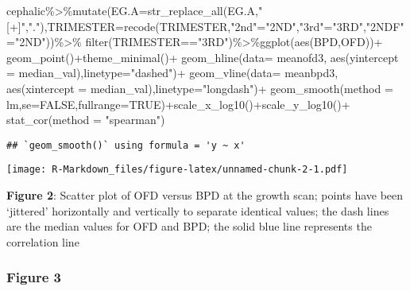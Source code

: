 \documentclass[
]{article}
\newenvironment{Shaded}{\begin{snugshade}}{\end{snugshade}}
\newcommand{\AttributeTok}[1]{\textcolor[rgb]{0.77,0.63,0.00}{#1}}
\newcommand{\ConstantTok}[1]{\textcolor[rgb]{0.00,0.00,0.00}{#1}}
\newcommand{\FunctionTok}[1]{\textcolor[rgb]{0.00,0.00,0.00}{#1}}
\newcommand{\NormalTok}[1]{#1}
\newcommand{\OtherTok}[1]{\textcolor[rgb]{0.56,0.35,0.01}{#1}}
\newcommand{\SpecialCharTok}[1]{\textcolor[rgb]{0.00,0.00,0.00}{#1}}
\newcommand{\StringTok}[1]{\textcolor[rgb]{0.31,0.60,0.02}{#1}}
\begin{document}
\begin{Shaded}
\begin{Highlighting}[]
\NormalTok{cephalic}\SpecialCharTok{\%\textgreater{}\%}\FunctionTok{mutate}\NormalTok{(}\AttributeTok{EG.A=}\FunctionTok{str\_replace\_all}\NormalTok{(EG.A,}\StringTok{"[+]"}\NormalTok{,}\StringTok{"."}\NormalTok{),}\AttributeTok{TRIMESTER=}\FunctionTok{recode}\NormalTok{(TRIMESTER,}\StringTok{"2nd"}\OtherTok{=}\StringTok{"2ND"}\NormalTok{,}\StringTok{"3rd"}\OtherTok{=}\StringTok{"3RD"}\NormalTok{,}\StringTok{"2NDF"}\OtherTok{=}\StringTok{"2ND"}\NormalTok{))}\SpecialCharTok{\%\textgreater{}\%}
  \FunctionTok{filter}\NormalTok{(TRIMESTER}\SpecialCharTok{==}\StringTok{"3RD"}\NormalTok{)}\SpecialCharTok{\%\textgreater{}\%}\FunctionTok{ggplot}\NormalTok{(}\FunctionTok{aes}\NormalTok{(BPD,OFD))}\SpecialCharTok{+}
  \FunctionTok{geom\_point}\NormalTok{()}\SpecialCharTok{+}\FunctionTok{theme\_minimal}\NormalTok{()}\SpecialCharTok{+}
  \FunctionTok{geom\_hline}\NormalTok{(}\AttributeTok{data=}\NormalTok{ meanofd3, }\FunctionTok{aes}\NormalTok{(}\AttributeTok{yintercept =}\NormalTok{ median\_val),}\AttributeTok{linetype=}\StringTok{"dashed"}\NormalTok{)}\SpecialCharTok{+}
  \FunctionTok{geom\_vline}\NormalTok{(}\AttributeTok{data=}\NormalTok{ meanbpd3, }\FunctionTok{aes}\NormalTok{(}\AttributeTok{xintercept =}\NormalTok{ median\_val),}\AttributeTok{linetype=}\StringTok{"longdash"}\NormalTok{)}\SpecialCharTok{+}
  \FunctionTok{geom\_smooth}\NormalTok{(}\AttributeTok{method =}\NormalTok{ lm,}\AttributeTok{se=}\ConstantTok{FALSE}\NormalTok{,}\AttributeTok{fullrange=}\ConstantTok{TRUE}\NormalTok{)}\SpecialCharTok{+}\FunctionTok{scale\_x\_log10}\NormalTok{()}\SpecialCharTok{+}\FunctionTok{scale\_y\_log10}\NormalTok{()}\SpecialCharTok{+}
  \FunctionTok{stat\_cor}\NormalTok{(}\AttributeTok{method =} \StringTok{"spearman"}\NormalTok{)}
\end{Highlighting}
\end{Shaded}

\begin{verbatim}
## `geom_smooth()` using formula = 'y ~ x'
\end{verbatim}

\texttt{[image: R-Markdown\_files/figure-latex/unnamed-chunk-2-1.pdf]}

\textbf{Figure 2}: Scatter plot of OFD versus BPD at the growth scan;
points have been `jittered' horizontally and vertically to separate
identical values; the dash lines are the median values for OFD and BPD;
the solid blue line represents the correlation line

\hypertarget{figure-3}{%
\subsubsection{\texorpdfstring{\textbf{Figure
3}}{Figure 3}}\label{figure-3}}
\end{document}
